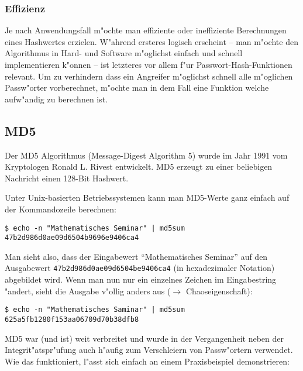 \begin{refsection}
\subsubsection{Effizienz}

Je nach Anwendungsfall m"ochte man effiziente oder ineffiziente Berechnungen
eines Hashwertes erzielen. W"ahrend ersteres logisch erscheint -- man m"ochte den
Algorithmus in Hard- und Software m"oglichst einfach und schnell implementieren
k"onnen -- ist letzteres vor allem f"ur Passwort-Hash-Funktionen relevant. Um zu
verhindern dass ein Angreifer m"oglichst schnell alle m"oglichen Passw"orter
vorberechnet, m"ochte man in dem Fall eine Funktion welche aufw"andig zu berechnen
ist.

\subsection{MD5}

Der MD5 Algorithmus (Message-Digest Algorithm 5) wurde im Jahr 1991 vom
Kryptologen Ronald L. Rivest entwickelt. MD5 erzeugt zu einer beliebigen
Nachricht einen 128-Bit Hashwert.

Unter Unix-basierten Betriebssystemen kann man MD5-Werte ganz einfach auf der
Kommandozeile berechnen:

\begin{verbatim}
$ echo -n "Mathematisches Seminar" | md5sum 
47b2d986d0ae09d6504b9696e9406ca4
\end{verbatim}

Man sieht also, dass der Eingabewert ``Mathematisches Seminar'' auf den
Ausgabewert \texttt{47b2\-d986\-d0ae\-09d6\-504b\-e940\-6ca4} (in
hexadezimaler Notation) abgebildet wird. Wenn man nun nur ein einzelnes
Zeichen im Eingabestring "andert, sieht die Ausgabe v"ollig anders aus
($\rightarrow$ Chaoseigenschaft):

\begin{verbatim}
$ echo -n "Mathematisches Saminar" | md5sum 
625a5fb1280f153aa06709d70b38dfb8
\end{verbatim}

MD5 war (und ist) weit verbreitet und wurde in der Vergangenheit neben der
Integrit"atspr"ufung auch h"aufig zum Verschleiern von Passw"ortern verwendet. Wie
das funktioniert, l"asst sich einfach an einem Praxisbeispiel demonstrieren:


\end{refsection}
